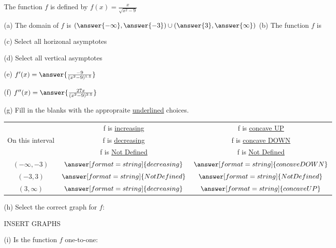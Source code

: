 \documentclass{ximera}
\begin{document}
\begin{exercise}
The function $f$ is defined by $f(x)=\frac{x}{\sqrt{x^2-9}}$

(a) The domain of $f$ is $(\answer{-\infty},\answer{-3})\cup (\answer{3},\answer{\infty})$
(b) The function $f$ is \begin{multipleChoice}
\end{multipleChoice}

(c) Select all horizonal asymptotes
\begin{selectAll}
\end{selectAll}

(d) Select all vertical asymptotes
\begin{selectAll}
\end{selectAll}  

(e) $f'(x)=\answer{\frac{-9}{(x^2-9)^{1.5}}}$

(f) $f''(x)=\answer{\frac{27x}{(x^2-9)^{2.5}}}$

(g) Fill in the blanks with the appropraite \underline{underlined} choices.

\begin{tabular}{|c|c|c|}\hline
 & f is \underline{increasing} & f is \underline{concave UP} \\
On this interval & f is \underline{decreasing} & f is \underline{concave DOWN} \\
 & f is \underline{Not Defined} & f is \underline{Not Defined} \\ \hline
$(-\infty,-3)$ & $\answer[format=string]{decreasing}$& $\answer[format=string]{concave DOWN}$\\ \hline
$(-3,3)$ & $\answer[format=string]{Not Defined}$& $\answer[format=string]{Not Defined}$\\ \hline
$(3,\infty)$ & $\answer[format=string]{decreasing}$& $\answer[format=string]{concave UP}$\\\hline 
\end{tabular}

(h) Select the correct graph for $f$:

INSERT GRAPHS

(i) Is the function $f$ one-to-one:
\begin{multipleChoice}
\end{multipleChoice}
\end{exercise}
\end{document}
